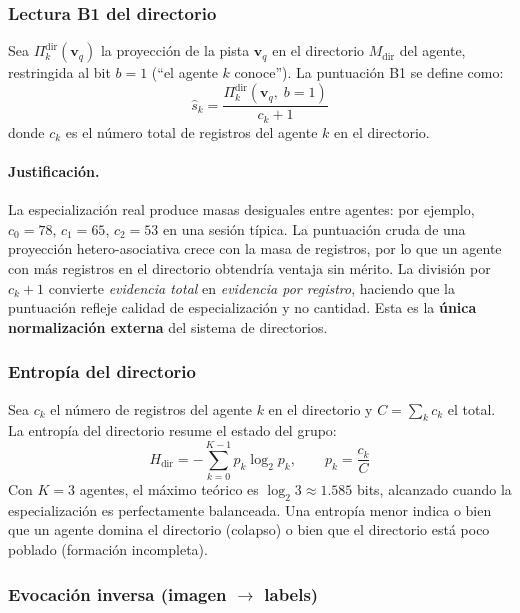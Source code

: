 \subsubsection*{Lectura B1 del directorio}

Sea $\Pi^{\mathrm{dir}}_k(\mathbf{v}_q)$ la proyección de la pista $\mathbf{v}_q$
en el directorio $M_{\mathrm{dir}}$ del agente, restringida al bit $b=1$
(``el agente $k$ conoce'').
La puntuación B1 se define como:
\begin{equation}
    \hat{s}_k = \frac{\Pi^{\mathrm{dir}}_k(\mathbf{v}_q,\; b{=}1)}{c_k + 1}
    \label{eq:b1}
\end{equation}
donde $c_k$ es el número total de registros del agente $k$ en el directorio.

\paragraph{Justificación.}
La especialización real produce masas desiguales entre agentes: por ejemplo,
$c_0 = 78$, $c_1 = 65$, $c_2 = 53$ en una sesión típica.
La puntuación cruda de una proyección hetero-asociativa crece con la masa de registros,
por lo que un agente con más registros en el directorio obtendría ventaja sin mérito.
La división por $c_k + 1$ convierte \emph{evidencia total} en \emph{evidencia por
registro}, haciendo que la puntuación refleje calidad de especialización y no cantidad.
Esta es la \textbf{única normalización externa} del sistema de directorios.

\subsubsection*{Entropía del directorio}

Sea $c_k$ el número de registros del agente $k$ en el directorio y
$C = \sum_k c_k$ el total.
La entropía del directorio resume el estado del grupo:
\begin{equation}
    H_{\mathrm{dir}} = -\sum_{k=0}^{K-1} p_k \log_2 p_k, \qquad p_k = \frac{c_k}{C}
    \label{eq:entropia-dir}
\end{equation}
Con $K=3$ agentes, el máximo teórico es $\log_2 3 \approx 1{.}585$ bits,
alcanzado cuando la especialización es perfectamente balanceada.
Una entropía menor indica o bien que un agente domina el directorio (colapso) o bien
que el directorio está poco poblado (formación incompleta).

\subsubsection*{Evocación inversa (imagen $\to$ labels)}

